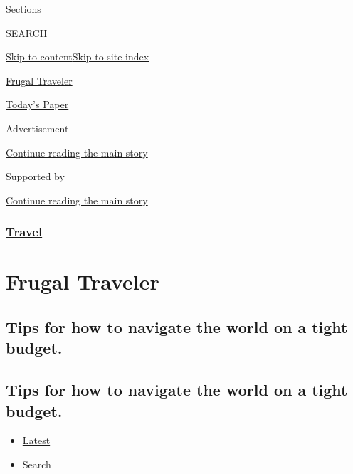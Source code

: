 Sections

SEARCH

\protect\hyperlink{site-content}{Skip to
content}\protect\hyperlink{site-index}{Skip to site index}

\href{https://www.nytimes3xbfgragh.onion/column/frugal-traveler}{Frugal
Traveler}

\href{https://myaccount.nytimes3xbfgragh.onion/auth/login?response_type=cookie\&client_id=vi}{}

\href{https://www.nytimes3xbfgragh.onion/section/todayspaper}{Today's
Paper}

Advertisement

\protect\hyperlink{after-top}{Continue reading the main story}

Supported by

\protect\hyperlink{after-sponsor}{Continue reading the main story}

\hypertarget{travel}{%
\subsubsection{\texorpdfstring{\href{/section/travel}{Travel}}{Travel}}\label{travel}}

\hypertarget{frugal-traveler}{%
\section{Frugal Traveler}\label{frugal-traveler}}

\hypertarget{tips-for-how-to-navigate-the-world-on-a-tight-budget}{%
\subsection{Tips for how to navigate the world on a tight
budget.}\label{tips-for-how-to-navigate-the-world-on-a-tight-budget}}

\hypertarget{tips-for-how-to-navigate-the-world-on-a-tight-budget-1}{%
\subsection{Tips for how to navigate the world on a tight
budget.}\label{tips-for-how-to-navigate-the-world-on-a-tight-budget-1}}

\begin{itemize}
\tightlist
\item
  \protect\hyperlink{stream-panel}{Latest}
\item
  Search
\end{itemize}

